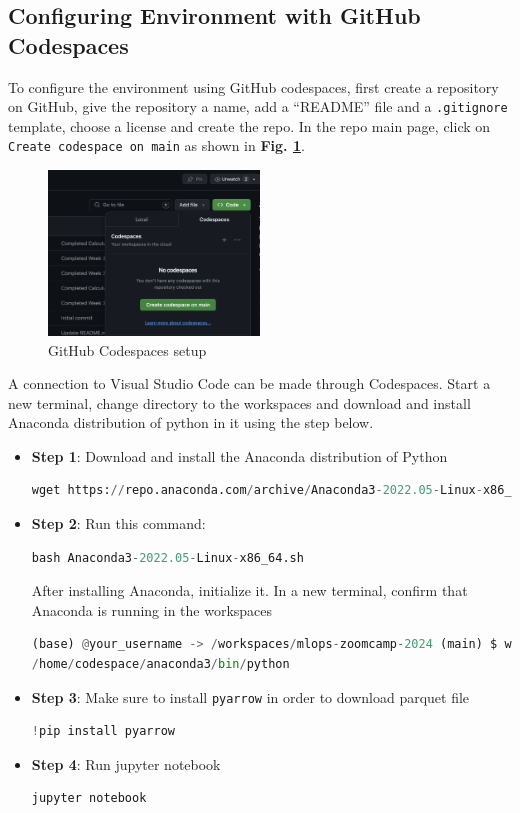 \documentclass[letterpaper,12pt,notitlepage,twoside]{report}
\begin{document}
\subsection{Configuring Environment with GitHub Codespaces}
To configure the environment using GitHub codespaces, first create a repository on GitHub, give the repository a name, add a ``README'' file and a \texttt{.gitignore} template, choose a license and create the repo. In the repo main page, click on \texttt{Create codespace on main} as shown in \textbf{Fig. \ref{fig:2}}.
\begin{figure}[h]
	\centering
	\includegraphics[width=0.5\textwidth]{Images/Codespaces.png}
	\caption{GitHub Codespaces setup}
	\label{fig:2}
\end{figure}
\FloatBarrier

A connection to Visual Studio Code can be made through Codespaces.  Start a new terminal, change directory to the workspaces and download and install Anaconda distribution of python in it using the step below.
 \begin{itemize}
\item \textbf{Step 1}: Download and install the Anaconda distribution of Python 
\begin{lstlisting}[language=python, numbers=none]
wget https://repo.anaconda.com/archive/Anaconda3-2022.05-Linux-x86_64.sh
\end{lstlisting}
\item \textbf{Step 2}: Run this command: 
\begin{lstlisting}[language=python, numbers=none]
bash Anaconda3-2022.05-Linux-x86_64.sh
\end{lstlisting}

After installing Anaconda, initialize it. In a new terminal, confirm that Anaconda is running in the workspaces
\begin{lstlisting}[language=python, numbers=none]
(base) @your_username -> /workspaces/mlops-zoomcamp-2024 (main) $ which python
/home/codespace/anaconda3/bin/python
\end{lstlisting}
\item \textbf{Step 3}: Make sure to install \texttt{pyarrow} in order to download parquet file
\begin{lstlisting}[language=python, numbers=none]
!pip install pyarrow
\end{lstlisting}
\item \textbf{Step 4}: Run jupyter notebook
\begin{lstlisting}[language=python, numbers=none]
jupyter notebook
\end{lstlisting}
\end{itemize}
\end{document}
